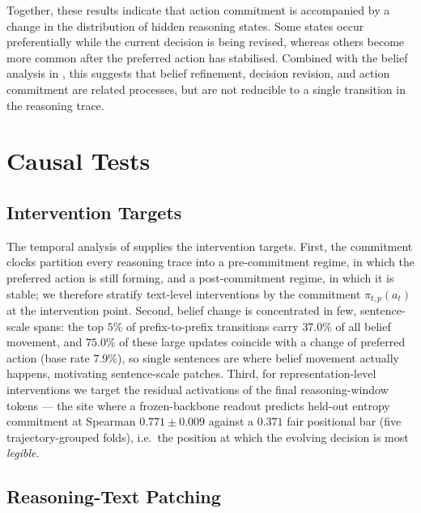 \documentclass{article}
\begin{document}

Together, these results indicate that action commitment is accompanied by a
change in the distribution of hidden reasoning states. Some states occur
preferentially while the current decision is being revised, whereas others
become more common after the preferred action has stabilised. Combined with
the belief analysis in , this suggests that belief
refinement, decision revision, and action commitment are related processes,
but are not reducible to a single transition in the reasoning trace.

\section{Causal Tests}
\label{sec:causal}

\subsection{Intervention Targets}
\label{sec:targets}
The temporal analysis of  supplies the intervention targets.
First, the commitment clocks partition every reasoning trace into a pre-commitment regime, in which the preferred action is still forming, and a post-commitment regime, in which it is stable; we therefore stratify text-level interventions by the commitment \(\pi_{t,p}(a_t)\) at the intervention point.
Second, belief change is concentrated in few, sentence-scale spans: the top \(5\%\) of prefix-to-prefix transitions carry \(37.0\%\) of all belief movement, and \(75.0\%\) of these large updates coincide with a change of preferred action (base rate \(7.9\%\)), so single sentences are where belief movement actually happens, motivating sentence-scale patches.
Third, for representation-level interventions we target the residual activations of the final reasoning-window tokens --- the site where a frozen-backbone readout predicts held-out entropy commitment at Spearman \(0.771 \pm 0.009\) against a \(0.371\) fair positional bar (five trajectory-grouped folds), i.e.\ the position at which the evolving decision is most \emph{legible}.

\subsection{Reasoning-Text Patching}
\label{sec:text-patching}
\end{document}
